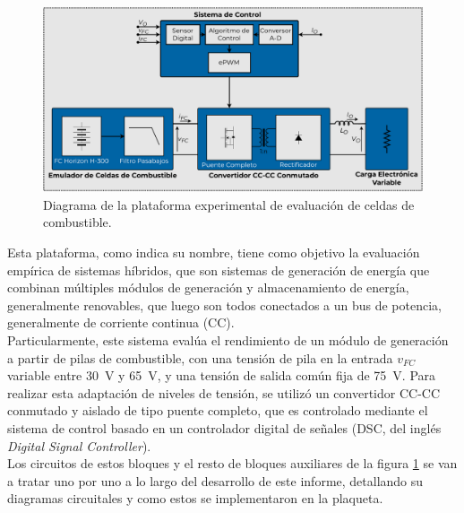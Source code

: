 \begin{figure}[h]
    \centering
    \includegraphics[scale=0.4]{Imagenes/Plataforma Experimental.pdf}
    \caption{Diagrama de la plataforma experimental de evaluación de celdas de combustible.}
    \label{fig:plataforma}
\end{figure}

Esta plataforma, como indica su nombre, tiene como objetivo la evaluación empírica de sistemas híbridos, que son sistemas de generación de energía que combinan múltiples módulos de generación y almacenamiento de energía, generalmente renovables, que luego son todos conectados a un bus de potencia, generalmente de corriente continua (CC).\\

Particularmente, este sistema evalúa el rendimiento de un módulo de generación a partir de pilas de combustible, con una tensión de pila en la entrada $v_{FC}$ variable entre \SI[]{30}[]{\volt} y \SI[]{65}[]{\volt}, y una tensión de salida común fija de \SI[]{75}[]{\volt}. Para realizar esta adaptación de niveles de tensión, se utilizó un convertidor CC-CC conmutado y aislado de tipo puente completo, que es controlado mediante el sistema de control basado en un controlador digital de señales (DSC, del inglés \textit{Digital Signal Controller}).\\

Los circuitos de estos bloques y el resto de bloques auxiliares de la figura \ref{fig:plataforma} se van a tratar uno por uno a lo largo del desarrollo de este informe, detallando su diagramas circuitales y como estos se implementaron en la plaqueta.\\